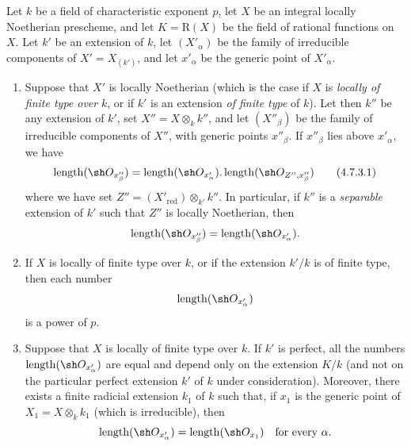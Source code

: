 \begin{proposition}[4.7.3]
\label{IV.4.7.3}
Let $k$ be a field of characteristic exponent $p$, let $X$ be an
integral locally Noetherian prescheme, and let
$K=\mathrm R(X)$ be the field of rational functions on $X$.
Let $k'$ be an extension of $k$, let $(X'_\alpha)$ be the family of
irreducible components of $X'=X_{(k')}$, and let $x'_\alpha$ be the
generic point of $X'_\alpha$.
\begin{enumerate}
\item[\rm(i)]
\label{IV.4.7.3.i}
Suppose that $X'$ is locally Noetherian \textup{(which is the case if
$X$ is \emph{locally of finite type over} $k$, or if $k'$ is an
extension \emph{of finite type} of $k$)}.
Let then $k''$ be any extension of $k'$, set
$X''=X\otimes_k k''$, and let $(X''_\beta)$ be the family of
irreducible components of $X''$, with generic points $x''_\beta$.
If $x''_\beta$ lies above $x'_\alpha$, we have
\begin{equation}
\operatorname{length}(\sh O_{x''_\beta})
=
\operatorname{length}(\sh O_{x'_\alpha})
 .\operatorname{length}(\sh O_{Z'',x''_\beta})
\tag{4.7.3.1}
\label{IV.4.7.3.1}
\end{equation}
where we have set $Z''=(X'_{\mathrm{red}})\otimes_{k'}k''$.
In particular, if $k''$ is a \emph{separable} extension of $k'$ such that
$Z''$ is locally Noetherian, then
\[
\operatorname{length}(\sh O_{x''_\beta})
=\operatorname{length}(\sh O_{x'_\alpha}).
\]

\item[\rm(ii)]
\label{IV.4.7.3.ii}
If $X$ is locally of finite type over $k$, or if the extension $k'/k$
is of finite type, then each number
\[
\operatorname{length}(\sh O_{x'_\alpha})
\]
is a power of $p$.

\item[\rm(iii)]
\label{IV.4.7.3.iii}
Suppose that $X$ is locally of finite type over $k$.
If $k'$ is perfect, all the numbers
$\operatorname{length}(\sh O_{x'_\alpha})$ are equal and depend
only on the extension $K/k$ \textup{(and not on the particular perfect
extension $k'$ of $k$ under consideration)}.
Moreover, there exists a finite radicial extension $k_1$ of $k$ such
that, if $x_1$ is the generic point of
$X_1=X\otimes_k k_1$ \textup{(}which is irreducible\textup{)}, then
\[
\operatorname{length}(\sh O_{x'_\alpha})
=\operatorname{length}(\sh O_{x_1})
\quad\text{for every }\alpha.
\]
\end{enumerate}
\end{proposition}

